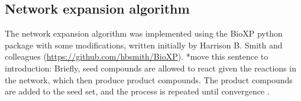 \subsection*{Network expansion algorithm} 

The network expansion algorithm was implemented using the BioXP python package with some modifications, written initially by Harrison B. Smith and colleagues (\href{https://github.com/hbsmith/BioXP}{https://github.com/hbsmith/BioXP}). *move this sentence to introduction: Briefly, seed compounds are allowed to react given the reactions in the network, which then produce product compounds. The product compounds are added to the seed set, and the process is repeated until convergence \cite{ebenhoh2004, handorf2005}. 
